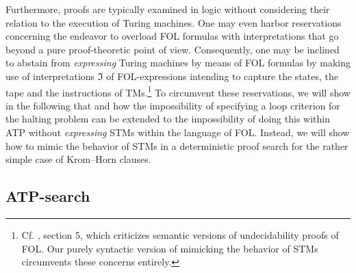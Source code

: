 \documentclass[%
  manuscript=article,   %
  year=2024,
  volume=77,
  doi=00000.000,
]{zfn}
\begin{document}
Furthermore, proofs are typically examined in logic without considering their relation to the execution of Turing machines. One may even harbor reservations concerning the endeavor to overload FOL formulas with interpretations that go beyond a pure proof-theoretic point of view. Consequently, one may be inclined to abstain from \emph{expressing} Turing machines by means of FOL formulas by making use of interpretations $\Im$ of FOL-expressions intending to capture the states, the tape and the instructions of TMs.\footnote{Cf. \parencite{Lampert2}, section 5, which criticizes semantic versions of undecidability proofs of FOL. Our purely syntactic version of mimicking the behavior of STMs circumvents these concerns entirely.} To circumvent these reservations, we will show in the following that and how the impossibility of specifying a loop criterion for the halting problem can be extended to the impossibility of doing this within ATP without \emph{expressing} STMs within the language of FOL. Instead, we will show how to mimic the behavior of STMs in a deterministic proof search for the rather simple case of Krom--Horn clauses. %

\subsection{ATP-search}\label{tableauxsec}
\end{document}
